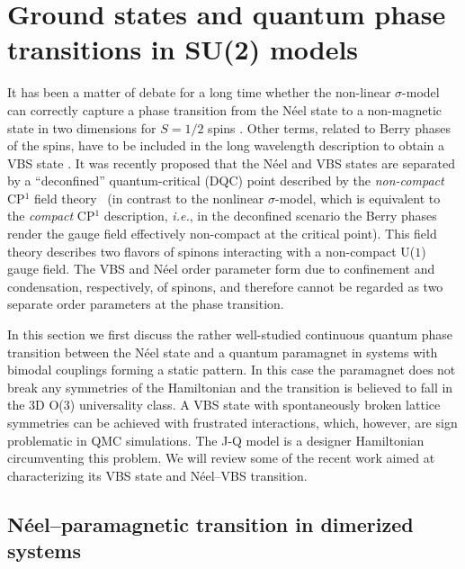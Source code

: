\documentclass[range]{ar2e}
\begin{document}
\section{Ground states and quantum phase transitions in SU(2) models}
\label{sec:su2models}

It has been a matter of debate for a long time whether the non-linear $\sigma$-model can correctly capture a phase transition from the N\'eel state 
to a non-magnetic state in two dimensions for $S=1/2$ spins \cite{Chakravarty89}. Other terms, related to Berry phases of the spins, have to be included in the long wavelength description to obtain a VBS state \cite{Read90,murthy1990:mono}. It was recently proposed that the N\'eel and VBS states are separated
by a ``deconfined'' quantum-critical (DQC) point \cite{Senthil04a} described by the {\it non-compact} CP$^1$ field theory~\cite{Motrunich04} (in contrast to the nonlinear 
$\sigma$-model, which is equivalent to the {\it compact} CP$^1$ description, {\em i.e.}, in the deconfined scenario the Berry phases render the gauge field effectively
non-compact at the critical point).
This field theory describes two flavors of spinons interacting with a non-compact U($1$) gauge field.  The VBS and N\'eel order parameter form due to confinement and condensation, 
respectively, of spinons, and therefore cannot be regarded as two separate order parameters at the phase transition.

In this section we first discuss the rather well-studied continuous quantum phase transition between the N\'eel state and a quantum paramagnet in systems 
with bimodal couplings forming a static pattern. In this case the paramagnet does not break any symmetries of the Hamiltonian and the transition 
is believed to fall in the 3D O($3$) universality class. A VBS state with spontaneously broken lattice symmetries can be achieved with frustrated 
interactions, which, however, are sign problematic in QMC simulations. The J-Q model \cite{Sandvik07} is a designer Hamiltonian circumventing this 
problem. We will review some of the recent work aimed at characterizing its VBS state and  N\'eel--VBS transition.

\subsection{N\'eel--paramagnetic transition in dimerized systems}
\label{sec:dimermodels}
\end{document}
